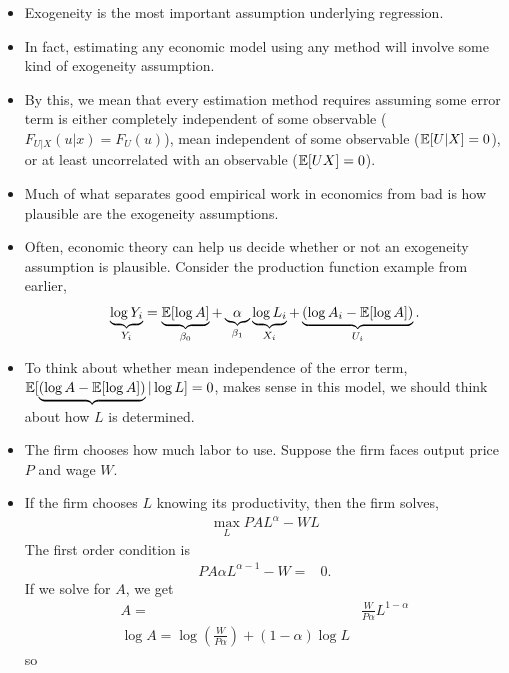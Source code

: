 \begin{frame}[allowframebreaks]
\begin{columns}[c]
\begin{column}{.48\textwidth}
    \end{column}
  \end{columns}

\framebreak

\begin{itemize}
\item Exogeneity is the most important assumption underlying
  regression. 
\item In fact, estimating any economic model using any method will involve some
kind of exogeneity assumption. 
\item By this, we mean that every estimation
method requires assuming some error term is either completely
independent of some observable ($F_{U|X}(u|x) =
F_U(u)$), mean independent of some observable
($\mathbb{E}[U|X] = 0$), or at least uncorrelated with an observable
($\mathbb{E}[U X] = 0$). 
\item Much of what separates good empirical work in
economics from bad is how plausible are the exogeneity
assumptions. 
\item Often, economic theory can help us decide whether or
not an exogeneity assumption is plausible. Consider the 
production function example from earlier, 
\[ \underbrace{\log Y_i}_{Y_i} = \underbrace{\mathbb{E}[\log A]}_{\beta_0}
+ \underbrace{\alpha}_{\beta_1} \underbrace{\log L_i}_{X_i} +
\underbrace{(\log{A}_i - \mathbb{E}[\log A])}_{U_i}. \]
\item To think about whether mean independence of the error term,
$\mathbb{E}[\underbrace{(\log{A} - \mathbb{E}[\log A])}|\log L]=0$, makes sense in
this model, we should think about how $L$ is determined. 
\item The firm
chooses how much labor to use. Suppose the firm faces output price $P$
and wage $W$. 
\item If the firm chooses $L$ knowing its productivity, then
the firm solves,
\begin{align*}
   \max_L P A L^\alpha - WL 
\end{align*}
The first order condition is 
\begin{align*}
  P A \alpha L^{\alpha -1} - W = & 0.
\end{align*}
If we solve for $A$, we get
\begin{align*}
  A = & \frac{W}{P \alpha } L^{1-\alpha} \\
  \log A = \log\left(\frac{W}{P \alpha }\right) + (1-\alpha) \log L
\end{align*}
so

\end{itemize}
\end{frame}
